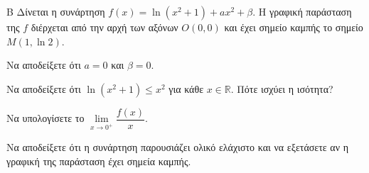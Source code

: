 \begin{thema}{Β}
Δίνεται η συνάρτηση $f(x) = \ln(x^2+1) + a x^2 + \beta$. Η γραφική παράσταση της $f$ διέρχεται από την αρχή των αξόνων $O(0,0)$ και έχει σημείο καμπής το σημείο $M(1, \ln 2)$.
\begin{erwthma}
  \item Να αποδείξετε ότι $a=0$ και $\beta=0$.
  \item Να αποδείξετε ότι $\ln(x^2+1) \le x^2$ για κάθε $x \in \mathbb{R}$. Πότε ισχύει η ισότητα?
  \item Να υπολογίσετε το $\lim\limits_{x \to 0^+} \dfrac{f(x)}{x}$.
  \item Να αποδείξετε ότι η συνάρτηση παρουσιάζει ολικό ελάχιστο και να εξετάσετε αν η γραφική της παράσταση έχει σημεία καμπής.
\end{erwthma}
\end{thema}
